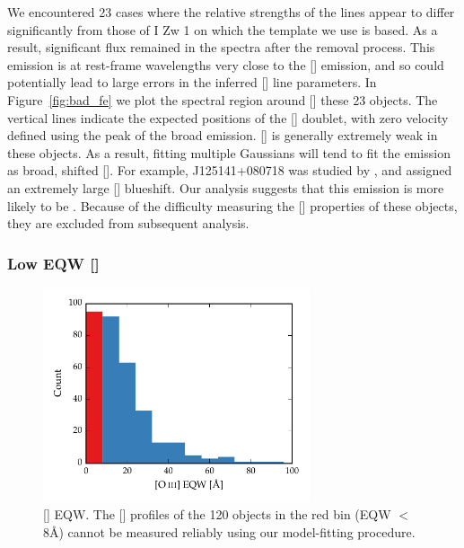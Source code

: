 We encountered 23 cases where the relative strengths of the  lines appear to differ significantly from those of I Zw 1 on which the  template we use is based. 
As a result, significant  flux remained in the spectra after the removal process. 
This emission is at rest-frame wavelengths very close to the [] emission, and so could potentially lead to large errors in the inferred [] line parameters. 
In Figure~\ref{fig:bad_fe} we plot the spectral region around [] these 23 objects.
The vertical lines indicate the expected positions of the [] doublet, with zero velocity defined using the peak of the broad \hb emission. 
[] is generally extremely weak in these objects. 
As a result, fitting multiple Gaussians will tend to fit the  emission as broad, shifted []. 
For example, J125141+080718 was studied by \citet{shen16a}, and assigned an extremely large [] blueshift. 
Our analysis suggests that this emission is more likely to be . 
Because of the difficulty measuring the [] properties of these objects, they are excluded from subsequent analysis.  

\subsubsection{Low \ac{EQW} []}

\begin{figure}
    \centering
    \includegraphics[width=0.7\textwidth]{figures/chapter04/oiii_eqw_hist.pdf} 
    \caption{[] \ac{EQW}. The [] profiles of the 120 objects in the red bin (\ac{EQW} $<$ 8\AA) cannot be measured reliably using our model-fitting procedure.}     
    \label{fig:oiii_strength_hist}
\end{figure}

